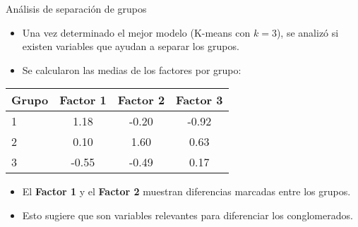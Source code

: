 \documentclass[
	11pt, %
]{beamer}
\begin{document}
\begin{frame}{Análisis de separación de grupos}
\begin{itemize}
    \item Una vez determinado el mejor modelo (K-means con $k=3$), se analizó si existen variables que ayudan a separar los grupos.
    \item Se calcularon las medias de los factores por grupo:
\end{itemize}
\begin{center}
\begin{tabular}{lccc}
\toprule
\textbf{Grupo} & \textbf{Factor 1} & \textbf{Factor 2} & \textbf{Factor 3} \\
\midrule
1 & 1.18 & -0.20 & -0.92 \\
2 & 0.10 &  1.60 &  0.63 \\
3 & -0.55 & -0.49 &  0.17 \\
\bottomrule
\end{tabular}
\end{center}
\vspace{0.3cm}
\begin{itemize}
    \item El \textbf{Factor 1} y el \textbf{Factor 2} muestran diferencias marcadas entre los grupos.
    \item Esto sugiere que son variables relevantes para diferenciar los conglomerados.
\end{itemize}
\end{frame}
\end{document}
